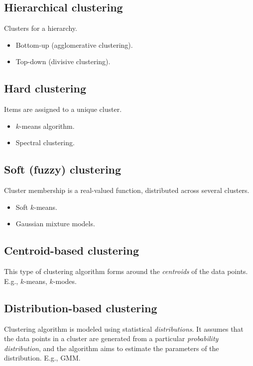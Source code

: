 \documentclass[
	number={6},
	title={Clustering}
]{cs584notes}
\begin{document}
\subsection{Hierarchical clustering}\label{subsec:hierarchical-clustering}
Clusters for a hierarchy.
\begin{itemize}
	\item Bottom-up (agglomerative clustering).
	\item Top-down (divisive clustering).
\end{itemize}

\subsection{Hard clustering}\label{subsec:hard-clustering}
Items are assigned to a unique cluster.
\begin{itemize}
	\item $k$-means algorithm.
	\item Spectral clustering.
\end{itemize}

\subsection{Soft (fuzzy) clustering}\label{subsec:soft-clustering}
Cluster membership is a real-valued function, distributed across several clusters.
\begin{itemize}
	\item Soft $k$-means.
	\item Gaussian mixture models.
\end{itemize}

\subsection{Centroid-based clustering}\label{subsec:centroid-based-clustering}
This type of clustering algorithm forms around the \emph{centroids} of the data points.
E.g., $k$-means, $k$-modes.

\subsection{Distribution-based clustering}\label{subsec:distribution-based-clustering}
Clustering algorithm is modeled using statistical \emph{distributions}.
It assumes that the data points in a cluster are generated from a particular \emph{probability distribution}, and the algorithm aims to estimate the parameters of the distribution.
E.g., GMM\@.
\end{document}
